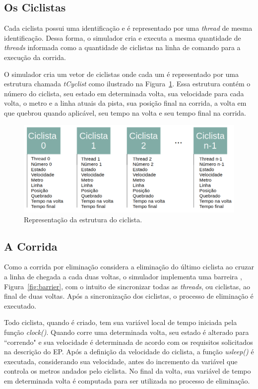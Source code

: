 \documentclass[12pt]{article}
\begin{document}
\subsection{Os Ciclistas}
\label{subsec:os-ciclistas}

Cada ciclista possui uma identificação e é representado por uma \textit{thread} de mesma identificação. Dessa forma, o simulador cria e executa a mesma quantidade de \textit{threads} informada como a quantidade de ciclistas na linha de comando para a execução da corrida.

O simulador cria um vetor de ciclistas onde cada um é representado por uma estrutura chamada \textit{tCyclist} como ilustrado na Figura~\ref{fig:cyclist}. Essa estrutura contém o número do ciclista, seu estado em determinada volta, sua velocidade para cada volta, o metro e a linha atuais da pista, sua posição final na corrida, a volta em que quebrou quando aplicável, seu tempo na volta e seu tempo final na corrida.

\begin{figure}[H]
	\centering
	\includegraphics[width=.9\textwidth]{cyclist.png}
	\caption{Representação da estrutura do ciclista.}
	\label{fig:cyclist}
\end{figure}


\subsection{A Corrida}

Como a corrida por eliminação considera a eliminação do último ciclista ao cruzar a linha de chegada a cada duas voltas, o simulador implementa uma barreira \cite{ibm:20}, Figura~\ref{fig:barrier}, com o intuito de sincronizar todas as \textit{threads}, ou ciclistas, ao final de duas voltas. Após a sincronização dos ciclistas, o processo de eliminação é executado.

Todo ciclista, quando é criado, tem sua variável local de tempo iniciada pela função \textit{clock()}. Quando corre uma determinada volta, seu estado é alterado para ``correndo" e sua velocidade é determinada de acordo com os requisitos solicitados na descrição do EP. Após  a definição da velocidade do ciclista, a função \textit{usleep()} é executada, considerando sua velocidade, antes do incremento da variável que controla os metros andados pelo ciclista. No final da volta, sua variável de tempo em determinada volta é computada para ser utilizada no processo de eliminação.
\end{document}
